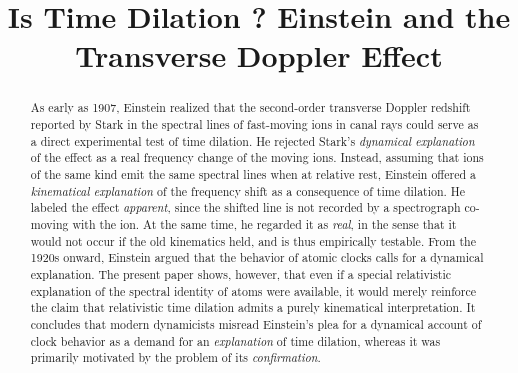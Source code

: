 \documentclass[submitted,12pt]{article}
\title{Is Time Dilation \s{Real}? Einstein and the Transverse Doppler Effect}
\begin{document}
\maketitle
 
 
 
\begin{abstract}
As early as 1907, Einstein realized that the second-order transverse Doppler redshift reported by Stark in the spectral lines of fast-moving ions in canal rays could serve as a direct experimental test of time dilation. He rejected Stark’s \emph{dynamical explanation} of the effect as a real frequency change of the moving ions. Instead, assuming that ions of the same kind emit the same spectral lines when at relative rest, Einstein offered a \emph{kinematical explanation} of the frequency shift as a consequence of time dilation. He labeled the effect \textit{apparent}, since the shifted line is not recorded by a spectrograph co-moving with the ion. At the same time, he regarded it as \textit{real}, in the sense that it would not occur if the old kinematics held, and is thus empirically testable. From the 1920s onward, Einstein argued that the behavior of atomic clocks calls for a dynamical explanation. The present paper shows, however, that even if a special relativistic explanation of the spectral identity of atoms were available, it would merely reinforce the claim that relativistic time dilation admits a purely kinematical interpretation. It concludes that modern dynamicists misread Einstein’s plea for a dynamical account of clock behavior as a demand for an \emph{explanation} of time dilation, whereas it was primarily motivated by the problem of its \emph{confirmation}.
 \end{abstract}



\intro
\end{document}
